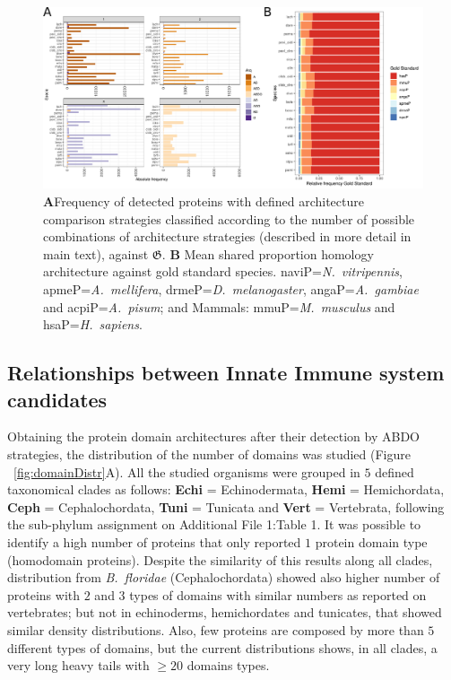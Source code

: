 \documentclass[11pt]{article}
\newcommand{\TODO}[1]{\begingroup\color{red}#1\endgroup}
\begin{document}
\begin{figure}[ht!]
\centering
\includegraphics[scale=0.43]{figures/unitedComparedGOLD}%
\caption{
\textbf{A}Frequency of detected proteins with defined architecture
comparison strategies classified according to the number of possible combinations of 
architecture strategies (described in more detail in main text), 
against $\boldsymbol{\mathfrak{G}}$. \textbf{B} Mean shared proportion 
homology architecture against gold standard species. \textsf{naviP=}\textit{N.\ 
vitripennis}, \textsf{apmeP=}\textit{A.\ mellifera}, \textsf{drmeP=}\textit{D.\ 
melanogaster}, \textsf{angaP=}\textit{A.\ gambiae} and 
\textsf{acpiP=}\textit{A.\ pisum}; and Mammals: 
\textsf{mmuP=}\textit{M.\ musculus} and \textsf{hsaP=}\textit{H.\ sapiens}.
}
\label{fig:FrecEstrat}
\end{figure}


\subsection*{Relationships between Innate Immune system candidates} 
\label{Orthology}

Obtaining the protein domain architectures after their detection by ABDO 
strategies, the distribution of the number of domains was studied (Figure 
~\ref{fig:domainDistr}A). All the studied organisms were grouped in $5$ 
defined taxonomical clades as follows: \textbf{Echi} = Echinodermata, 
\textbf{Hemi} = Hemichordata, \textbf{Ceph} = Cephalochordata, \textbf{Tuni} = 
Tunicata and \textbf{Vert} = Vertebrata, following the sub-phylum assignment on 
Additional File 1:Table 1. It was possible to identify a high number of 
proteins that only reported $1$ protein domain type (homodomain proteins).
Despite the similarity of this results along all clades, distribution 
from \textsl{B.\ floridae} (Cephalochordata) showed also higher number of 
proteins with $2$ and $3$ types of domains with similar numbers as reported 
on vertebrates; but not in echinoderms, hemichordates and tunicates, that 
showed similar density distributions. Also, few proteins are composed by more 
than $5$ different types of domains, but the current distributions shows, in 
all clades, a very long heavy tails with \TODO{$\ge 20$ domains types}.
\end{document}
